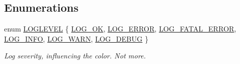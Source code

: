 \subsection*{\-Enumerations}
\begin{DoxyCompactItemize}
\item 
enum \hyperlink{LogHandler_8hh_acc58a0a25bf6982de2b101803e46130a}{\-L\-O\-G\-L\-E\-V\-E\-L} \{ \*
\hyperlink{LogHandler_8hh_acc58a0a25bf6982de2b101803e46130aa746c53b13e16f15d1d885f75efaf58b1}{\-L\-O\-G\-\_\-\-O\-K}, 
\hyperlink{LogHandler_8hh_acc58a0a25bf6982de2b101803e46130aa230506cce5c68c3bac5a821c42ed3473}{\-L\-O\-G\-\_\-\-E\-R\-R\-O\-R}, 
\hyperlink{LogHandler_8hh_acc58a0a25bf6982de2b101803e46130aac58a40c151a8445666c3a3d82887151e}{\-L\-O\-G\-\_\-\-F\-A\-T\-A\-L\-\_\-\-E\-R\-R\-O\-R}, 
\hyperlink{LogHandler_8hh_acc58a0a25bf6982de2b101803e46130aa6e98ff471e3ce6c4ef2d75c37ee51837}{\-L\-O\-G\-\_\-\-I\-N\-F\-O}, 
\*
\hyperlink{LogHandler_8hh_acc58a0a25bf6982de2b101803e46130aac8041ffa22bc823d4726701cdb13fc13}{\-L\-O\-G\-\_\-\-W\-A\-R\-N}, 
\hyperlink{LogHandler_8hh_acc58a0a25bf6982de2b101803e46130aab9f002c6ffbfd511da8090213227454e}{\-L\-O\-G\-\_\-\-D\-E\-B\-U\-G}
 \}
\begin{DoxyCompactList}\small\item\em \-Log severity, influencing the color. \-Not more. \end{DoxyCompactList}\end{DoxyCompactItemize}


